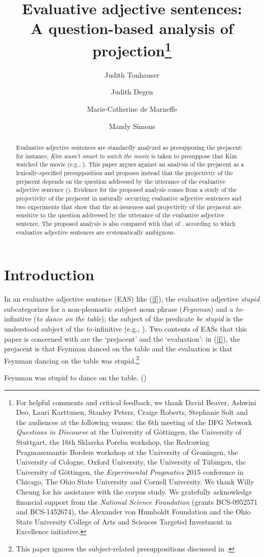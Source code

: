 \documentclass[11pt,fleqn]{article}
\title{Evaluative adjective sentences: \\ A question-based analysis of projection\thanks{For helpful comments and critical feedback, we thank David Beaver, Ashwini Deo, Lauri Karttunen, Stanley Peters, Craige Roberts,
Stephanie Solt and the audiences at the following venues: the 6th meeting of the DFG Network
{\em Questions in Discourse} at the University of G\"ottingen, 
the University of Stuttgart, the 16th Sklarska Poreba workshop, the
Redrawing Pragmasemantic Borders workshop at the University of
Groningen, the University of Cologne, Oxford University, the University of T\"ubingen,  the University of G\"ottingen, the {\em
Experimental Pragmatics} 2015 conference in Chicago, The Ohio State
University and Cornell University. We thank Willy Cheung for his assistance with the corpus study. We gratefully acknowledge
financial support from the {\em National Science Foundation} (grants
BCS-0952571 and BCS-1452674), the Alexander von Humboldt Foundation and the Ohio State
University College of Arts and Sciences Targeted Investment in
Excellence initiative.}}
\author[$\circ$]{Judith Tonhauser}
\author[$\bullet$]{Judith Degen}
\author[$\circ$]{Marie-Catherine de Marneffe}
\author[$\star$]{Mandy Simons}
\affil[$\circ$]{The Ohio State University}
\affil[$\bullet$]{Stanford University}
\affil[$\star$]{Carnegie Mellon University}
\newcommand{\6}{\mbox{$[\hspace*{-.6mm}[$}}
\newcommand{\9}{\mbox{$]\hspace*{-.6mm}]$}}
\begin{document}

\maketitle

\begin{abstract}



Evaluative adjective sentences are standardly analyzed as presupposing the prejacent: for instance, {\em Kim wasn't smart to
watch the movie} is taken to presuppose that Kim watched the movie
(e.g., \citealt{norrick78,barker02,oshima09b,kertz2010}). This paper argues against an analysis of the prejacent as a lexically-specified presupposition and proposes instead that the projectivity of the prejacent depends on the question addressed by the utterance of the evaluative adjective sentence (\citealt{beaver-clark08,best-question,brst-ar}). Evidence for the proposed analysis comes from a study of the projectivity of the prejacent in naturally occurring evaluative adjective sentences and two experiments that show that the at-issueness and projectivity of the prejacent are sensitive to the question addressed by the utterance of the evaluative adjective sentence. The proposed analysis is also compared with that of \citealt{karttunen-etal2014}, according to which evaluative adjective sentences are systematically ambiguous. 


\end{abstract}


\section{Introduction}\label{s1}

In an evaluative adjective sentence (EAS) like (\ref{f}), the
evaluative adjective {\em stupid} subcategorizes for a non-pleonastic subject noun
phrase ({\em Feynman}) and a {\em to-}infinitive ({\em to
dance on the table}); the subject of the predicate {\em be stupid} is the understood subject of the {\em to-}infinitive (e.g., \citealt{wilkinson70, norrick78,barker02,kertz2010}). Two contents of EASs that this paper is concerned with are the `prejacent' and the `evaluation': in (\ref{f}), the prejacent is that Feynman danced on the table and the evaluation is that 
Feynman dancing on the table was stupid.\footnote{This paper ignores the subject-related presuppositions discussed in \citealt{barker02}.}

\begin{exe} \ex\label{f} Feynman was stupid to dance on the table. \hfill (\citealt[18]{barker02})

\end{exe} 
\end{document}
